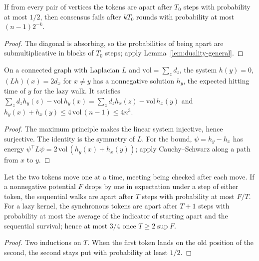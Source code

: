 \begin{theorem}\label{thm:hp24}
\leanok{}
If from every pair of vertices the tokens are apart after $T_0$ steps with probability at
most $1/2$, then consensus fails after $kT_0$ rounds with probability at most
$(n-1)2^{-k}$.
\end{theorem}
\begin{proof}\leanok
The diagonal is absorbing, so the probabilities of being apart are submultiplicative in
blocks of $T_0$ steps; apply Lemma~\ref{lem:duality-general}.
\end{proof}
\begin{lemma}\label{lem:hitting}
\leanok
On a connected graph with Laplacian $L$ and $\mathrm{vol}=\sum_z d_z$, the system
$h(y)=0$, $(Lh)(x)=2d_x$ for $x\neq y$ has a nonnegative solution $h_y$, the expected
hitting time of $y$ for the lazy walk. It satisfies
$\sum_z d_z h_y(z)-\mathrm{vol}\,h_y(x)=\sum_z d_z h_x(z)-\mathrm{vol}\,h_x(y)$ and
$h_y(x)+h_x(y)\le 4\,\mathrm{vol}\,(n-1)\le 4n^3$.
\end{lemma}
\begin{proof}\leanok
The maximum principle makes the linear system injective, hence surjective. The identity is
the symmetry of $L$. For the bound, $\psi=h_y-h_x$ has energy
$\psi^\top L\psi=2\,\mathrm{vol}\,(h_y(x)+h_x(y))$; apply Cauchy--Schwarz along a path from
$x$ to $y$.
\end{proof}
\begin{lemma}\label{lem:sequential}
\leanok{}
Let the two tokens move one at a time, meeting being checked after each move. If a
nonnegative potential $F$ drops by one in expectation under a step of either token, the
sequential walks are apart after $T$ steps with probability at most $F/T$. For a lazy
kernel, the synchronous tokens are apart after $T+1$ steps with probability at most the
average of the indicator of starting apart and the sequential survival; hence at most $3/4$
once $T\ge 2\sup F$.
\end{lemma}
\begin{proof}\leanok
Two inductions on $T$. When the first token lands on the old position of the second, the
second stays put with probability at least $1/2$.
\end{proof}
